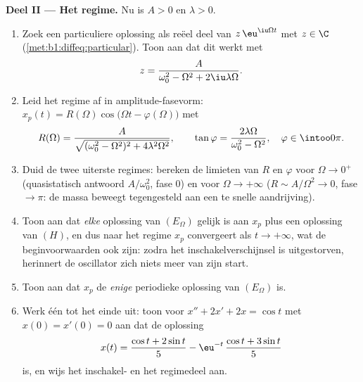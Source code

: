 \begin{problem}
\medskip
\noindent\textbf{Deel II --- Het regime.} Nu is $A > 0$ en $\lambda > 0$.
\begin{enumerate}[resume]
  \item Zoek een particuliere oplossing als reëel deel van
        $z\,\eu^{\iu\Omega t}$ met $z \in \C$
        (\cref{met:b1:diffeq:particular}). Toon aan dat dit werkt met
        \[
        z = \frac{A}{\omega_0^2 - \Omega^2 + 2\iu\lambda\Omega} .
        \]
  \item Leid het regime af in amplitude-fasevorm: $x_p(t) =
        R(\Omega)\cos\bigl(\Omega t - \varphi(\Omega)\bigr)$ met
        \[
        R(\Omega) = \frac{A}{\sqrt{(\omega_0^2 - \Omega^2)^2 +
        4\lambda^2\Omega^2}},
        \qquad
        \tan\varphi = \frac{2\lambda\Omega}{\omega_0^2 -
        \Omega^2},
        \quad \varphi \in \intoo0\pi .
        \]
  \item Duid de twee uiterste regimes: bereken de limieten van $R$ en
        $\varphi$ voor $\Omega \to 0^+$ (quasistatisch antwoord
        $A/\omega_0^2$, fase $0$) en voor $\Omega \to +\infty$ ($R \sim
        A/\Omega^2 \to 0$, fase $\to \pi$: de massa beweegt tegengesteld
        aan een te snelle aandrijving).
  \item Toon aan dat \emph{elke} oplossing van $(E_\Omega)$ gelijk is
        aan $x_p$ plus een oplossing van $(H)$, en dus naar het regime
        $x_p$ convergeert als $t \to +\infty$, wat de beginvoorwaarden
        ook zijn: zodra het inschakelverschijnsel is uitgestorven,
        herinnert de oscillator zich niets meer van zijn start.
  \item Toon aan dat $x_p$ de \emph{enige} periodieke oplossing van
        $(E_\Omega)$ is.
  \item Werk één  tot het einde uit: toon voor $x'' + 2x'
        + 2x = \cos t$ met $x(0) = x'(0) = 0$ aan dat de oplossing
        \[
        x(t) = \frac{\cos t + 2\sin t}5
        - \eu^{-t}\,\frac{\cos t + 3\sin t}5
        \]
        is, en wijs het inschakel- en het regimedeel aan.
\end{enumerate}


\end{problem}
